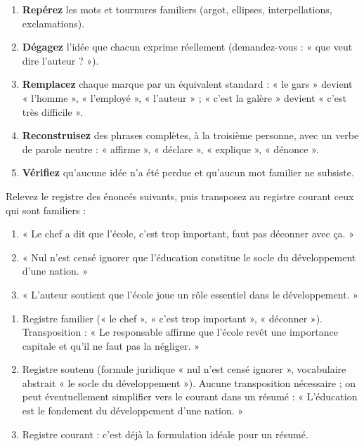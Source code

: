 \documentclass[11pt]{article}
\begin{document}
\begin{methode}
\begin{enumerate}
\item \textbf{Repérez} les mots et tournures familiers (argot, ellipses, interpellations, exclamations).
\item \textbf{Dégagez} l'idée que chacun exprime réellement (demandez-vous : « que veut dire l'auteur ? »).
\item \textbf{Remplacez} chaque marque par un équivalent standard : « le gars » devient « l'homme », « l'employé », « l'auteur » ; « c'est la galère » devient « c'est très difficile ».
\item \textbf{Reconstruisez} des phrases complètes, à la troisième personne, avec un verbe de parole neutre : « affirme », « déclare », « explique », « dénonce ».
\item \textbf{Vérifiez} qu'aucune idée n'a été perdue et qu'aucun mot familier ne subsiste.
\end{enumerate}
\end{methode}

\begin{exercice}
Relevez le registre des énoncés suivants, puis transposez au registre courant ceux qui sont familiers :
\begin{enumerate}
\item « Le chef a dit que l'école, c'est trop important, faut pas déconner avec ça. »
\item « Nul n'est censé ignorer que l'éducation constitue le socle du développement d'une nation. »
\item « L'auteur soutient que l'école joue un rôle essentiel dans le développement. »
\end{enumerate}
\end{exercice}

\begin{corrige}
\begin{enumerate}
\item Registre familier (« le chef », « c'est trop important », « déconner »). Transposition : « Le responsable affirme que l'école revêt une importance capitale et qu'il ne faut pas la négliger. »
\item Registre soutenu (formule juridique « nul n'est censé ignorer », vocabulaire abstrait « le socle du développement »). Aucune transposition nécessaire ; on peut éventuellement simplifier vers le courant dans un résumé : « L'éducation est le fondement du développement d'une nation. »
\item Registre courant : c'est déjà la formulation idéale pour un résumé.
\end{enumerate}
\end{corrige}
\end{document}

